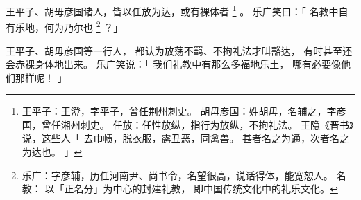 
\switchcolumn*[\section{}]

王平子、胡毋彦国诸人，皆以任放为达，或有裸体者%
\footnote{%
    王平子：王澄，字平子，曾任荆州刺史。
    胡毋彦国：姓胡毋，名辅之，字彦国，曾任湘州刺史。
    任放：任性放纵，指行为放纵，不拘礼法。
          王隐《晋书》说，这些人「
              去巾帻，脱衣服，露丑恶，同禽兽。
              甚者名之为通，次者名之为达也。
          」
}%
。
乐广笑曰：「
    名教中自有乐地，何为乃尔也%
    \footnote{%
        乐广：字彦辅，历任河南尹、尚书令，名望很高，说话得体，能宽恕人。
        名教：
            以「正名分」为中心的封建礼教，
            即中国传统文化中的礼乐文化。
    }%
？」

\switchcolumn

王平子、胡毋彦国等一行人，
都认为放荡不羁、不拘礼法才叫豁达，
有时甚至还会赤裸身体地出来。
乐广笑说：「
      我们礼教中有那么多福地乐土，
      哪有必要像他们那样呢！
」

